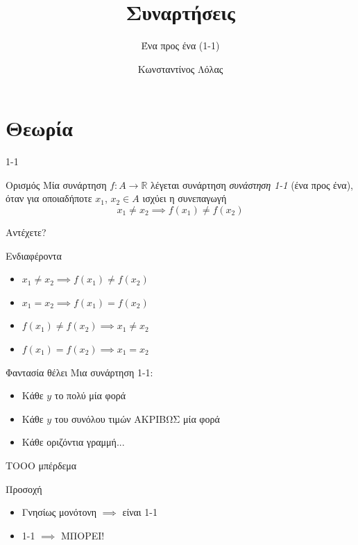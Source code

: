 \documentclass{presentation}
\title{Συναρτήσεις}
\subtitle{Ένα προς ένα (1-1)}
\author[Λόλας]{Κωνσταντίνος Λόλας }
\begin{document}
\begin{frame}
  \titlepage
\end{frame}

\section{Θεωρία}
\begin{frame}{1-1}
  \begin{block}{Ορισμός}
    Μία συνάρτηση $f:Α\to\mathbb{R}$ λέγεται συνάρτηση \emph{συνάστηση 1-1} (ένα προς ένα), όταν για οποιαδήποτε $x_1$, $x_2\in Α$ ισχύει η συνεπαγωγή
    $$x_1\ne x_2 \implies f(x_1)\ne f(x_2)$$
  \end{block}
\end{frame}

\begin{frame}{Αντέχετε?}
  \begin{exampleblock}{Ενδιαφέροντα}
    \begin{itemize}
      \item $x_1\ne x_2 \implies f(x_1)\ne f(x_2)$
      \item $x_1= x_2 \implies f(x_1)= f(x_2)$
      \item $f(x_1)\ne f(x_2) \implies x_1\ne x_2$
      \item $f(x_1)= f(x_2) \implies x_1= x_2$
    \end{itemize}
  \end{exampleblock}
\end{frame}

\begin{frame}{Φαντασία θέλει}
  Μια συνάρτηση 1-1:
  \begin{itemize}[<+-|alert@+>]
    \item Κάθε $y$ το πολύ μία φορά
    \item Κάθε $y$ του συνόλου τιμών ΑΚΡΙΒΩΣ μία φορά
    \item Κάθε οριζόντια γραμμή...
  \end{itemize}
\end{frame}

\begin{frame}{ΤΟΟΟ μπέρδεμα}
  \begin{alertblock}{Προσοχή}
    \begin{itemize}
      \item Γνησίως μονότονη $\implies$ \pause είναι 1-1 \pause
      \item  1-1 $\implies$ \pause ΜΠΟΡΕΙ!
    \end{itemize}
  \end{alertblock}
\end{frame}
\end{document}
